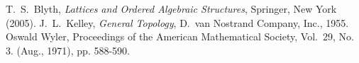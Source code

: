 \documentclass[12pt]{article}
\begin{document}
\begin{thebibliography}{8}
 T.~S.~Blyth, \emph{Lattices and Ordered Algebraic Structures}, Springer, New York (2005).
 J.~L.~Kelley, \emph{General Topology}, D.~van Nostrand Company, Inc., 1955.
 Oswald Wyler, \emph{}
Proceedings of the American Mathematical Society, Vol.~29, No. 3. (Aug., 1971), pp. 588-590.

\end{thebibliography}
\end{document}
